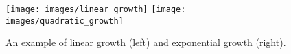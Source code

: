 \begin{figure}[ht]
	\centering
	\texttt{[image: images/linear\_growth]}\hfill
	\texttt{[image: images/quadratic\_growth]}
	\caption{An example of linear growth (left) and exponential growth (right).}
	\label{fig:linear_exponential_growth}
\end{figure}
